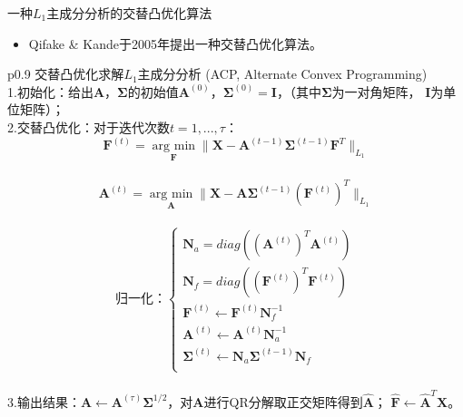 \begin{frame}{一种$L_1$主成分分析的交替凸优化算法}
    \begin{itemize}
        \item
        Qifake \& Kande于2005年提出一种交替凸优化算法。
    \end{itemize} 
    \begin{table}[H]%
        \tiny 
        \centering%
        \begin{tabular}{{p{0.9\columnwidth}}}%
        \toprule%
        交替凸优化求解$L_1$主成分分析 (ACP, Alternate Convex Programming) \\
        \midrule%
        1.初始化：给出$\bm{A}$，$\bm \Sigma$的初始值$\bm{A}^{(0)}$，$\bm \Sigma^{(0)} = \bm I$，（其中$\bm \Sigma$为一对角矩阵，
        $\bm I$为单位矩阵）； \\
    
        2.交替凸优化：对于迭代次数$t = 1, ..., \tau$： \\
        $$ \bm F^{(t)} = \underset{\bm F}{\operatorname{arg\ min}} \|\bm X - \bm{A}^{(t-1)}\bm\Sigma^{(t-1)}\bm F^{T}\|_{L_1}$$ \\
        $$ \bm{A}^{(t)} = \underset{\bm{A}}{\operatorname{arg\ min}} \|\bm X - \bm{A}\bm\Sigma^{(t-1)}{(\bm F^{(t)})}^T \|_{L_1}$$ \\
        \begin{equation*}
            \text{归一化：}\left\{
                        \begin{array}{clr}
                        \bm N_a = diag({(\bm A^{(t)})}^T\bm{A}^{(t)})\\
                        \bm N_f = diag({(\bm F^{(t)})}^T\bm F^{(t)})\\
                        \bm F^{(t)} \leftarrow \bm F^{(t)}\bm N_f^{-1}\\
                        \bm{A}^{(t)}\leftarrow \bm{A}^{(t)}\bm N_a^{-1}\\
                        \bm \Sigma^{(t)} \leftarrow \bm N_a\bm \Sigma^{(t-1)}\bm N_f\\
                        \end{array}
            \right.
        \end{equation*} \\
    
        3.输出结果：$\bm{A} \leftarrow \bm{A}^{(\tau)}\bm \Sigma^{1/2}$，对$\bm{A}$进行QR分解取正交矩阵得到$\hat{\bm{A}}$；
        $\hat{\bm{F}} \leftarrow \hat{\bm{A}}^T\bm{X}$。 \\
        \bottomrule%
        \end{tabular}
    \end{table}%
\end{frame}

